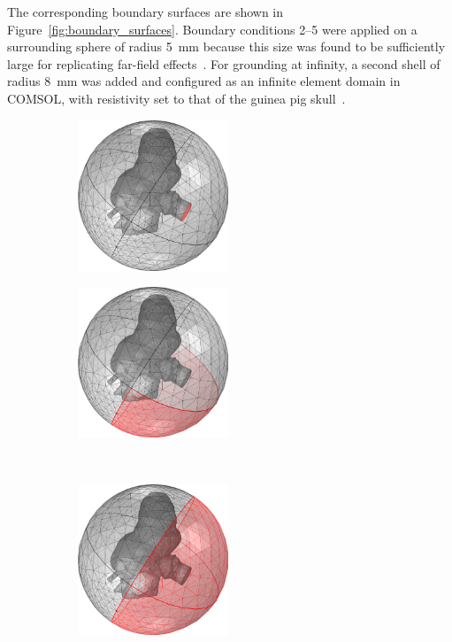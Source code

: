 The corresponding boundary surfaces are shown in
Figure~\ref{fig:boundary_surfaces}. Boundary conditions 2--5 were applied on a
surrounding sphere of radius 5~mm because this size was found to be sufficiently
large for replicating far-field effects~\cite{wong2013ciap}. For grounding at
infinity, a second shell of radius 8~mm was added and configured as an infinite
element domain in COMSOL, with resistivity set to that of the guinea pig
skull~\cite{suesserman1992}.

\begin{figure}
	\centering
	
	\begin{subfigure}[t]{0.4\textwidth}
        \centering
        \includegraphics[height=4.5cm]{Validation/mesh_nerve}
        \caption{}
        \label{fig:mesh_nerve}
    \end{subfigure}%
	\begin{subfigure}[t]{0.4\textwidth}
        \centering
        \includegraphics[height=4.5cm]{Validation/mesh_caudal}
        \caption{}
        \label{mesh_caudal}
    \end{subfigure}\\%
    \vspace{1em}%
	\begin{subfigure}[t]{0.4\textwidth}
        \centering
        \includegraphics[height=4.5cm]{Validation/mesh_hemi}

\end{subfigure}
\end{figure}
